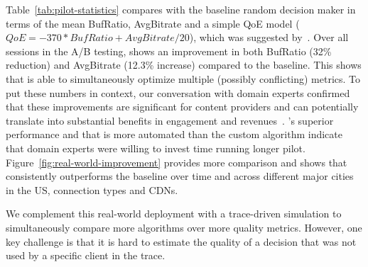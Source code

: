 Table~\ref{tab:pilot-statistics} compares \dda with the 
baseline random decision maker in terms of the mean 
BufRatio, AvgBitrate
and a simple QoE model 
($QoE=-370*BufRatio+AvgBitrate/20$), which was 
suggested by~\cite{sigcomm12,sigcomm11}. 
Over all sessions in the A/B testing, \dda shows an 
improvement in both BufRatio (32\% reduction) and 
AvgBitrate (12.3\% increase) compared to the baseline.
This shows that \dda is able to simultaneously optimize
multiple (possibly conflicting) metrics. 
To put these numbers in context, our conversation 
with domain experts  confirmed that these 
improvements are significant for content providers and 
 can potentially translate into  substantial benefits in 
 engagement and revenues~\cite{convivapersonal}.
\dda's superior performance and that  \dda is more 
automated than the custom algorithm indicate that 
domain experts were willing to invest time running 
longer pilot.
Figure~\ref{fig:real-world-improvement} provides 
more comparison and shows that \dda consistently 
outperforms the baseline over time and across different 
major cities in the US, connection types and CDNs. 




We complement this real-world deployment with a 
trace-driven simulation to simultaneously compare 
more algorithms over more quality metrics. 
However, one key challenge is that it is hard to 
estimate the quality of a decision that was not used 
by a specific client in the trace.

